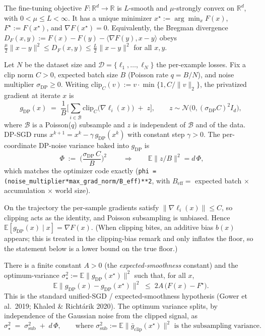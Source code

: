 \begin{assumption}\label{ass:curv}
The fine-tuning objective $F:\mathbb{R}^d\to\mathbb{R}$ is $L$-smooth and $\mu$-strongly convex on $\mathbb{R}^d$, with $0<\mu\le L<\infty$. It has a unique minimizer $x^\star:=\arg\min_x F(x)$, $F^\star:=F(x^\star)$, and $\nabla F(x^\star)=0$. Equivalently, the Bregman divergence $D_F(x,y):=F(x)-F(y)-\langle\nabla F(y),x-y\rangle$ obeys $\tfrac{\mu}{2}\|x-y\|^2\le D_F(x,y)\le\tfrac{L}{2}\|x-y\|^2$ for all $x,y$.
\end{assumption}

\begin{definition}\label{def:dpsgd}
Let $N$ be the dataset size and $\mathcal D=\{\ell_1,\dots,\ell_N\}$ the per-example losses. Fix a clip norm $C>0$, expected batch size $B$ (Poisson rate $q=B/N$), and noise multiplier $\sigma_{\mathrm{DP}}\ge0$. Writing $\mathrm{clip}_C(v):=v\cdot\min\{1,C/\|v\|_2\}$, the privatized gradient at iterate $x$ is
\[
g_{\mathrm{DP}}(x)\;=\;\frac1B\Big[\sum_{i\in\mathcal B}\mathrm{clip}_C\big(\nabla\ell_i(x)\big)\;+\;z\Big],
\qquad z\sim\mathcal N\!\big(0,(\sigma_{\mathrm{DP}}C)^2 I_d\big),
\]
where $\mathcal B$ is a Poisson($q$) subsample and $z$ is independent of $\mathcal B$ and of the data. DP-SGD runs $x^{k+1}=x^k-\gamma\,g_{\mathrm{DP}}(x^k)$ with constant step $\gamma>0$. The per-coordinate DP-noise variance baked into $g_{\mathrm{DP}}$ is
\[
\boxed{\;\Phi\;:=\;\Big(\frac{\sigma_{\mathrm{DP}}\,C}{B}\Big)^2\;}
\qquad\Longrightarrow\qquad \mathbb E\big\|z/B\big\|^2=d\,\Phi,
\]
which matches the optimizer code exactly (\texttt{phi = (noise\_multiplier*max\_grad\_norm/B\_eff)**2}, with $B_{\mathrm{eff}}=$ expected batch $\times$ accumulation $\times$ world size).
\end{definition}

\begin{assumption}\label{ass:unbiased}
On the trajectory the per-sample gradients satisfy $\|\nabla\ell_i(x)\|\le C$, so clipping acts as the identity, and Poisson subsampling is unbiased. Hence $\mathbb E[g_{\mathrm{DP}}(x)\mid x]=\nabla F(x)$. (When clipping bites, an additive bias $b(x)$ appears; this is treated in the clipping-bias remark and only inflates the floor, so the statement below is a lower bound on the true floor.)
\end{assumption}

\begin{assumption}\label{ass:es}
There is a finite constant $A>0$ (the \emph{expected-smoothness} constant) and the optimum-variance $\sigma_\star^2:=\mathbb E\|g_{\mathrm{DP}}(x^\star)\|^2$ such that, for all $x$,
\[
\mathbb E\big\|g_{\mathrm{DP}}(x)-g_{\mathrm{DP}}(x^\star)\big\|^2\;\le\;2A\,\big(F(x)-F^\star\big).
\]
This is the standard unified-SGD / expected-smoothness hypothesis (Gower et al.\ 2019; Khaled \& Richt\'arik 2020). The optimum variance splits, by independence of the Gaussian noise from the clipped signal, as
\[
\sigma_\star^2\;=\;\sigma_{\mathrm{sub}}^2\;+\;d\,\Phi,
\qquad\text{where }\sigma_{\mathrm{sub}}^2:=\mathbb E\|\bar g_{\mathrm{clip}}(x^\star)\|^2\text{ is the subsampling variance.}
\]
\end{assumption}

